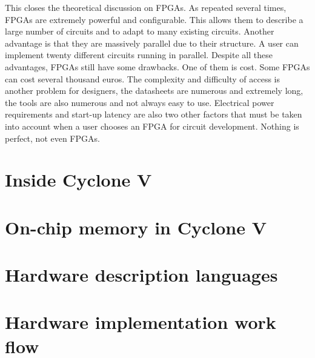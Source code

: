 This closes the theoretical discussion on FPGAs. As repeated several times, FPGAs are extremely 
powerful and configurable. This allows them to describe a large number of circuits and to adapt to
many existing circuits. Another advantage is that they are massively parallel due to their 
structure. A user can implement twenty different circuits running in parallel. Despite all these 
advantages, FPGAs still have some drawbacks. One of them is cost. Some FPGAs can cost several 
thousand euros. The complexity and difficulty of access is another problem for designers, the 
datasheets are numerous and extremely long, the tools are also numerous and not always easy to use. 
Electrical power requirements and start-up latency are also two other factors that must be taken 
into account when a user chooses an FPGA for circuit development. Nothing is perfect, not even 
FPGAs.

\section{Inside Cyclone V}

\section{On-chip memory in Cyclone V}

\section{Hardware description languages}

\section{Hardware implementation work flow}
